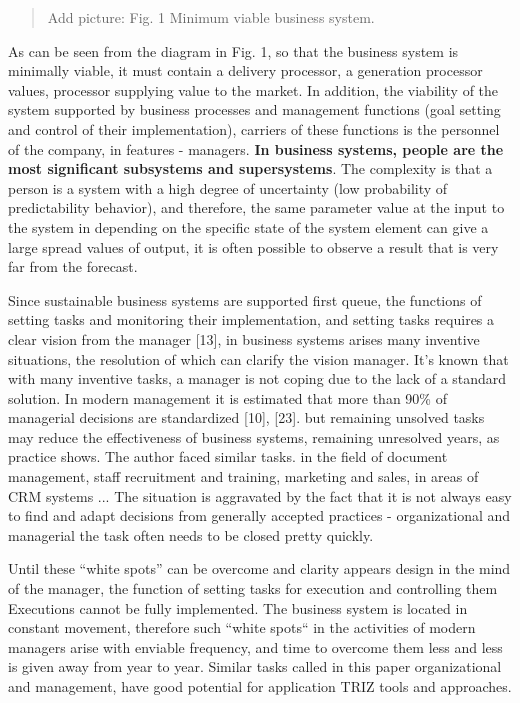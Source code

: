 \documentclass[11pt,a4paper]{book}
\newcommand{\addpicture}[1]{
  \begin{quote} Add picture: #1\end{quote}
}
\begin{document}
\addpicture{Fig. 1 Minimum viable business system.}

As can be seen from the diagram in Fig. 1, so that the business system is
minimally viable, it must contain a delivery processor, a generation processor
values, processor supplying value to the market. In addition, the viability of
the system supported by business processes and management functions (goal
setting and control of their implementation), carriers of these functions is
the personnel of the company, in features - managers. \textbf{In business
  systems, people are the most significant subsystems and supersystems}. The
complexity is that a person is a system with a high degree of uncertainty (low
probability of predictability behavior), and therefore, the same parameter
value at the input to the system in depending on the specific state of the
system element can give a large spread values of output, it is often possible
to observe a result that is very far from the forecast.

Since sustainable business systems are supported first queue, the functions of
setting tasks and monitoring their implementation, and setting tasks requires
a clear vision from the manager [13], in business systems arises many
inventive situations, the resolution of which can clarify the vision
manager. It’s known that with many inventive tasks, a manager is not coping
due to the lack of a standard solution. In modern management it is estimated
that more than 90\% of managerial decisions are standardized [10], [23]. but
remaining unsolved tasks may reduce the effectiveness of business systems,
remaining unresolved years, as practice shows. The author faced similar tasks.
in the field of document management, staff recruitment and training, marketing
and sales, in areas of CRM systems ... The situation is aggravated by the fact
that it is not always easy to find and adapt decisions from generally accepted
practices - organizational and managerial the task often needs to be closed
pretty quickly.

Until these “white spots” can be overcome and clarity appears design in the
mind of the manager, the function of setting tasks for execution and
controlling them Executions cannot be fully implemented. The business system
is located in constant movement, therefore such “white spots“ in the
activities of modern managers arise with enviable frequency, and time to
overcome them less and less is given away from year to year. Similar tasks
called in this paper organizational and management, have good potential for
application TRIZ tools and approaches.
\end{document}
